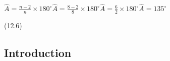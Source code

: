 {\begin{mdframed}[linewidth=4, leftmargin=40, rightmargin=40]
\begin{exercise}
\begin{enumerate}[noitemsep, label=\textbf{Step} \textbf{\arabic*}. ]
{\begin{equation}
      \end{equation}
    }{%
    \setlength{\mymathboxwidth}{\columnwidth}
      \addtolength{\mymathboxwidth}{-48pt}
    \par\vspace{12pt}\noindent\begin{minipage}{\columnwidth}
    \parbox[t]{\mymathboxwidth}{\large\begin{math}
    \hat{A}=\frac{n-2}{n}\ensuremath{\times}{180}^{\circ }\hat{A}=\frac{8-2}{8}\ensuremath{\times}{180}^{\circ }\hat{A}=\frac{6}{2}\ensuremath{\times}{180}^{\circ }\hat{A}={135}^{\circ }\end{math}}\hfill
    \parbox[t]{48pt}{\raggedleft 
    (12.6)}
    \end{minipage}\vspace{12pt}\par
    }%
    

\end{enumerate}
        


    \end{exercise}
    \end{mdframed}
    }
    \noindent
  


    
    
%        
%     
%     
    
    
    
    
  
    \label{m39354*cid2}
            \subsection{ Introduction}
            \nopagebreak
            
